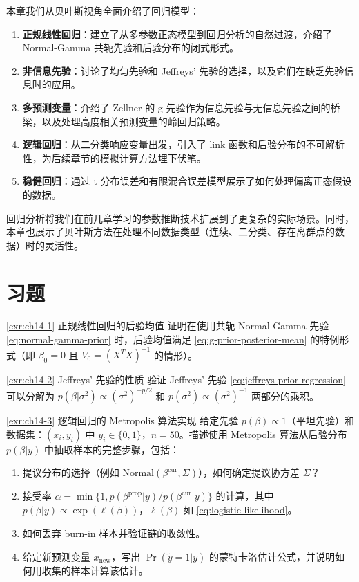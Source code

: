 本章我们从贝叶斯视角全面介绍了回归模型：

\begin{enumerate}
  \item \textbf{正规线性回归}：建立了从多参数正态模型到回归分析的自然过渡，介绍了 Normal-Gamma 共轭先验和后验分布的闭式形式。
  \item \textbf{非信息先验}：讨论了均匀先验和 Jeffreys' 先验的选择，以及它们在缺乏先验信息时的应用。
  \item \textbf{多预测变量}：介绍了 Zellner 的 g-先验作为信息先验与无信息先验之间的桥梁，以及处理高度相关预测变量的岭回归策略。
  \item \textbf{逻辑回归}：从二分类响应变量出发，引入了 link 函数和后验分布的不可解析性，为后续章节的模拟计算方法埋下伏笔。
  \item \textbf{稳健回归}：通过 t 分布误差和有限混合误差模型展示了如何处理偏离正态假设的数据。
\end{enumerate}

回归分析将我们在前几章学习的参数推断技术扩展到了更复杂的实际场景。同时，本章也展示了贝叶斯方法在处理不同数据类型（连续、二分类、存在离群点的数据）时的灵活性。

\section{习题}\label{sec:ch14-exercises}

\begin{Exercise}{\ref{exr:ch14-1} 正规线性回归的后验均值}
\label{exr:ch14-1}
证明在使用共轭 Normal-Gamma 先验 \cref{eq:normal-gamma-prior} 时，后验均值满足 \cref{eq:g-prior-posterior-mean} 的特例形式（即 $\beta_0 = 0$ 且 $V_0 = (X^TX)^{-1}$ 的情形）。
\end{Exercise}

\begin{Exercise}{\ref{exr:ch14-2} Jeffreys' 先验的性质}
\label{exr:ch14-2}
验证 Jeffreys' 先验 \cref{eq:jeffreys-prior-regression} 可以分解为 $p(\beta | \sigma^2) \propto (\sigma^2)^{-p/2}$ 和 $p(\sigma^2) \propto (\sigma^2)^{-1}$ 两部分的乘积。
\end{Exercise}

\begin{Exercise}{\ref{exr:ch14-3} 逻辑回归的 Metropolis 算法实现}
\label{exr:ch14-3}
给定先验 $p(\beta) \propto 1$（平坦先验）和数据集：$(x_i, y_i)$ 中 $y_i \in \{0,1\}$，$n=50$。描述使用 Metropolis 算法从后验分布 $p(\beta | y)$ 中抽取样本的完整步骤，包括：
\begin{enumerate}
  \item 提议分布的选择（例如 $\text{Normal}(\beta^{\text{cur}}, \Sigma)$），如何确定提议协方差 $\Sigma$？
  \item 接受率 $\alpha = \min\{1, p(\beta^{\text{prop}}|y)/p(\beta^{\text{cur}}|y)\}$ 的计算，其中 $p(\beta|y) \propto \exp(\ell(\beta))$，$\ell(\beta)$ 如 \cref{eq:logistic-likelihood}。
  \item 如何丢弃 burn-in 样本并验证链的收敛性。
  \item 给定新预测变量 $x_{\text{new}}$，写出 $\Pr(\tilde{y}=1|y)$ 的蒙特卡洛估计公式，并说明如何用收集的样本计算该估计。
\end{enumerate}
\end{Exercise}

